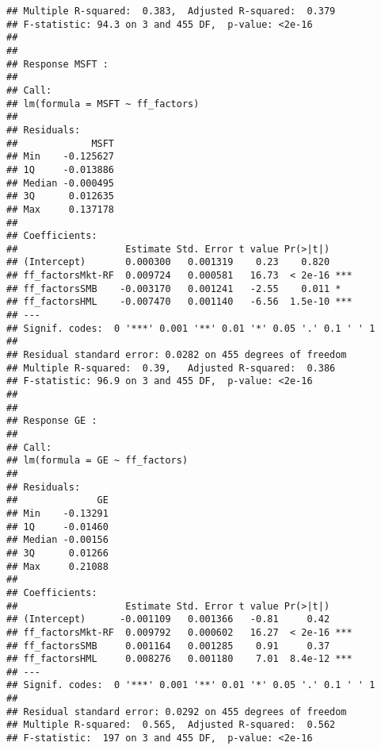 \documentclass[a4paper]{article}\usepackage[]{graphicx}\usepackage[]{color}
\makeatletter
\newenvironment{kframe}{%
 \def\at@end@of@kframe{}%
 \ifinner\ifhmode%
  \def\at@end@of@kframe{\end{minipage}}%
  \begin{minipage}{\columnwidth}%
 \fi\fi%
 \def\FrameCommand##1{\hskip\@totalleftmargin \hskip-\fboxsep
 \colorbox{shadecolor}{##1}\hskip-\fboxsep
     \hskip-\linewidth \hskip-\@totalleftmargin \hskip\columnwidth}%
 \MakeFramed {\advance\hsize-\width
   \@totalleftmargin\z@ \linewidth\hsize
   \@setminipage}}%
 {\par\unskip\endMakeFramed%
 \at@end@of@kframe}
\newenvironment{knitrout}{}{} %
\makeatother
\begin{document}
\begin{knitrout}
\begin{kframe}
\begin{verbatim}
## Multiple R-squared:  0.383,	Adjusted R-squared:  0.379 
## F-statistic: 94.3 on 3 and 455 DF,  p-value: <2e-16
## 
## 
## Response MSFT :
## 
## Call:
## lm(formula = MSFT ~ ff_factors)
## 
## Residuals:
##             MSFT
## Min    -0.125627
## 1Q     -0.013886
## Median -0.000495
## 3Q      0.012635
## Max     0.137178
## 
## Coefficients:
##                   Estimate Std. Error t value Pr(>|t|)    
## (Intercept)       0.000300   0.001319    0.23    0.820    
## ff_factorsMkt-RF  0.009724   0.000581   16.73  < 2e-16 ***
## ff_factorsSMB    -0.003170   0.001241   -2.55    0.011 *  
## ff_factorsHML    -0.007470   0.001140   -6.56  1.5e-10 ***
## ---
## Signif. codes:  0 '***' 0.001 '**' 0.01 '*' 0.05 '.' 0.1 ' ' 1
## 
## Residual standard error: 0.0282 on 455 degrees of freedom
## Multiple R-squared:  0.39,	Adjusted R-squared:  0.386 
## F-statistic: 96.9 on 3 and 455 DF,  p-value: <2e-16
## 
## 
## Response GE :
## 
## Call:
## lm(formula = GE ~ ff_factors)
## 
## Residuals:
##              GE
## Min    -0.13291
## 1Q     -0.01460
## Median -0.00156
## 3Q      0.01266
## Max     0.21088
## 
## Coefficients:
##                   Estimate Std. Error t value Pr(>|t|)    
## (Intercept)      -0.001109   0.001366   -0.81     0.42    
## ff_factorsMkt-RF  0.009792   0.000602   16.27  < 2e-16 ***
## ff_factorsSMB     0.001164   0.001285    0.91     0.37    
## ff_factorsHML     0.008276   0.001180    7.01  8.4e-12 ***
## ---
## Signif. codes:  0 '***' 0.001 '**' 0.01 '*' 0.05 '.' 0.1 ' ' 1
## 
## Residual standard error: 0.0292 on 455 degrees of freedom
## Multiple R-squared:  0.565,	Adjusted R-squared:  0.562 
## F-statistic:  197 on 3 and 455 DF,  p-value: <2e-16
\end{verbatim}
\end{kframe}
\end{knitrout}
\end{document}
